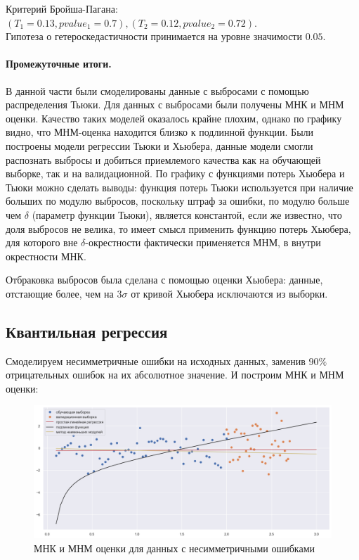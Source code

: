 \documentclass[a4paper,12pt]{article}
\begin{document}
Критерий Бройша-Пагана: $(T_1 = 0.13, pvalue_1 = 0.7), (T_2 = 0.12, pvalue_2 = 0.72)$.\\
Гипотеза о гетероскедастичности принимается на уровне значимости $0.05$.


\paragraph{Промежуточные итоги.\\}

В данной части были смоделированы данные с выбросами с помощью распределения Тьюки. Для данных с выбросами были получены МНК и МНМ оценки. Качество таких моделей оказалось крайне плохим, однако по графику видно, что МНМ-оценка находится близко к подлинной функции. Были построены модели регрессии Тьюки и Хьюбера, данные модели смогли распознать выбросы и добиться приемлемого качества как на обучающей выборке, так и на валидационной. По графику с функциями потерь Хьюбера и Тьюки можно сделать выводы: функция потерь Тьюки используется при наличие больших по модулю выбросов, поскольку штраф за ошибки, по модулю больше чем $\delta$ (параметр функции Тьюки), является константой, если же известно, что доля выбросов не велика, то имеет смысл применить функцию потерь Хьюбера, для которого вне $\delta$-окрестности фактически применяется МНМ, в внутри окрестности МНК.

Отбраковка выбросов была сделана с помощью оценки Хьюбера: данные, отстающие более, чем на $3\sigma$ от кривой Хьюбера исключаются из выборки.



\subsection{Квантильная регрессия}

Смоделируем несимметричные ошибки на исходных данных, заменив $90\%$ отрицательных ошибок на их абсолютное значение. И построим МНК и МНМ оценки:
\begin{figure}[H]
    \centering
    \includegraphics[width=\linewidth]{src/img/несимметричные_ошибки.png}
    \caption{МНК и МНМ оценки для данных с несимметричными ошибками}
\end{figure}
\end{document}
